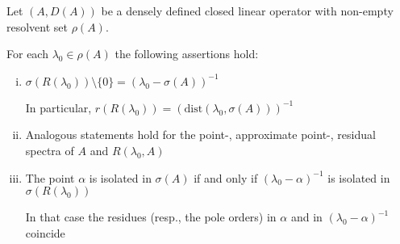 \begin{proposition}\label{prop:a3-2.5}
	
	Let $(A,D(A))$ be a densely defined closed linear operator with non-empty resolvent set $\rho(A)$.
	
	For each $\lambda_{0} \in \rho(A)$ the following assertions hold:
	
	\begin{enumerate}[(i)]
		\item $\sigma(R(\lambda_{0})) \setminus \{0\} = (\lambda_{0} - \sigma(A))^{-1}$
		
		In particular, $r(R(\lambda_{0})) = (\text{dist}(\lambda_{0},\sigma(A)))^{-1}$
		
		\item Analogous statements hold for the point-, approximate point-, residual spectra of $A$ and $R(\lambda_{0},A)$
		
		\item The point $\alpha$ is isolated in $\sigma(A)$ if and only if $(\lambda_{0}-\alpha)^{-1}$ is isolated in $\sigma(R(\lambda_{0}))$
		
		In that case the residues (resp., the pole orders) in $\alpha$ and in $(\lambda_{0}-\alpha)^{-1}$ coincide
	\end{enumerate}
\end{proposition}

